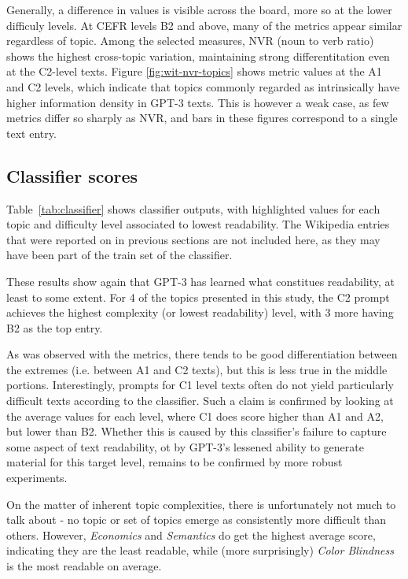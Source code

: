 \documentclass[11pt]{article}
\begin{document}
Generally, a difference in values is visible across the board, more so at the lower difficuly levels. At CEFR levels B2 and above, many of the metrics appear similar regardless of topic. Among the selected measures, NVR (noun to verb ratio) shows the highest cross-topic variation, maintaining strong differentitation even at the C2-level texts. Figure \ref{fig:wit-nvr-topics} shows metric values at the A1 and C2 levels, which indicate that topics commonly regarded as intrinsically have higher information density in GPT-3 texts. This is however a weak case, as few metrics differ so sharply as NVR, and bars in these figures correspond to a single text entry.



\subsection{Classifier scores}



Table~\ref{tab:classifier} shows classifier outputs, with highlighted values for each topic and difficulty level associated to lowest readability. The Wikipedia entries that were reported on in previous sections are not included here, as they may have been part of the train set of the classifier.

These results show again that GPT-3 has learned what constitues readability, at least to some extent. For 4 of the topics presented in this study, the C2 prompt achieves the highest complexity (or lowest readability) level, with 3 more having B2 as the top entry. 

As was observed with the metrics, there tends to be good differentiation between the extremes (i.e. between A1 and C2 texts), but this is less true in the middle portions. Interestingly, prompts for C1 level texts often do not yield particularly difficult texts according to the classifier. Such a claim is confirmed by looking at the average values for each level, where C1 does score higher than A1 and A2, but lower than B2. Whether this is caused by this classifier's failure to capture some aspect of text readability, ot by GPT-3's lessened ability to generate material for this target level, remains to be confirmed by more robust experiments.

On the matter of inherent topic complexities, there is unfortunately not much to talk about - no topic or set of topics emerge as consistently more difficult than others. However, \emph{Economics} and \emph{Semantics} do get the highest average score, indicating they are the least readable, while (more surprisingly) \emph{Color Blindness} is the most readable on average.
\end{document}
